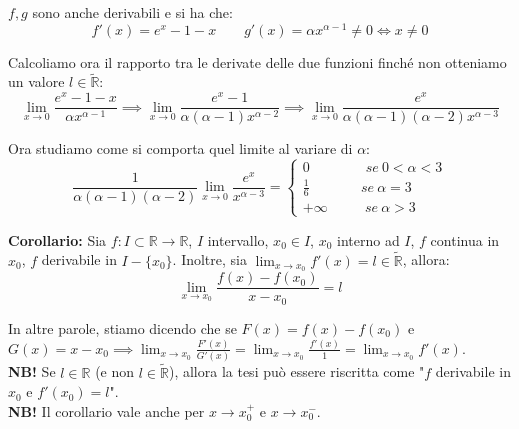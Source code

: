 \documentclass{article}
\begin{document}
\noindent $f, g$ sono anche derivabili e si ha che:
\begin{equation*}
    f'(x) = e^x - 1 - x \qquad g'(x) = \alpha x^{\alpha - 1} \neq 0 \iff x \neq 0
\end{equation*}

\noindent Calcoliamo ora il rapporto tra le derivate delle due funzioni finché non otteniamo un valore $l \in \widetilde{\mathbb{R}}$:
\begin{equation*}
    \lim_{x \to 0} \frac{e^x - 1 - x}{\alpha x^{\alpha - 1}} \implies \lim_{x \to 0} \frac{e^x - 1}{\alpha(\alpha - 1) x^{\alpha - 2}} \implies \lim_{x \to 0} \frac{e^x}{\alpha(\alpha - 1)(\alpha - 2) x^{\alpha -3}}
\end{equation*}

\noindent Ora studiamo come si comporta quel limite al variare di $\alpha$:
\begin{equation*}
    \frac{1}{\alpha(\alpha - 1)(\alpha - 2)}\lim_{x \to 0} \frac{e^x}{x^{\alpha -3}} = \begin{cases}
        0 \qquad \qquad se \ 0 < \alpha < 3 \\
        \frac{1}{6} \qquad \quad \ \ \ se \ \alpha = 3\\
        +\infty \qquad \ \ \ se \ \alpha > 3
    \end{cases}
\end{equation*}

\noindent\textbf{Corollario:} Sia $f: I \subset \mathbb{R} \xrightarrow{} \mathbb{R}$, $I$ intervallo, $x_0 \in I$, $x_0$ interno ad $I$, $f$ continua in $x_0$, $f$ derivabile in $I - \{x_0\}$. Inoltre, sia $\lim_{x \to x_0} f'(x) = l \in \widetilde{\mathbb{R}}$, allora:
\begin{equation*}
    \lim_{x \to x_0} \frac{f(x) - f(x_0)}{x - x_0} = l
\end{equation*}

\noindent In altre parole, stiamo dicendo che se $F(x) = f(x) - f(x_0)$ e $G(x) = x - x_0 \implies \lim_{x \to x_0} \frac{F'(x)}{G'(x)} = \lim_{x \to x_0} \frac{f'(x)}{1} = \lim_{x \to x_0} f'(x)$.\\

\noindent\textbf{NB!} Se $l \in \mathbb{R}$ (e non $l \in \widetilde{\mathbb{R}}$), allora la tesi può essere riscritta come "$f$ derivabile in $x_0$ e $f'(x_0) = l$".\\

\noindent\textbf{NB!} Il corollario vale anche per $x \to x_0^+$ e $x \to x_0^-$.\\
\end{document}
